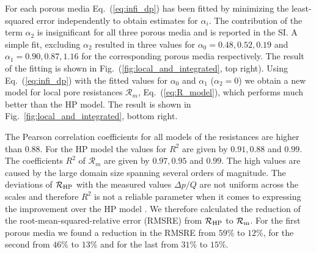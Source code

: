 \documentclass[draft]{agujournal2019}
\begin{document}
For each porous media Eq.~(\ref{eq:infi_dp}) has been fitted by minimizing the least-squared error independently to obtain estimates for $\alpha_i$. The contribution of the term $\alpha_2$ is insignificant for all three porous media and is reported in the SI. A simple fit, excluding $\alpha_2$ resulted in three values for $\alpha_0 = 0.48, 0.52, 0.19$ and $\alpha_1 = 0.90, 0.87, 1.16$ for the corresponding porous media respectively. The result of the fitting is shown in Fig.~(\ref{fig:local_and_integrated}, top right). Using Eq.~(\ref{eq:infi_dp}) with the fitted values for $\alpha_0$ and $\alpha_1$ ($\alpha_2 = 0$) we obtain a new model for local pore resistances $\mathcal{R}_m$, Eq.~(\ref{eq:R_model}), which performs much better than the HP model. The result is shown in Fig.~\ref{fig:local_and_integrated}, bottom right. 

The Pearson correlation coefficients for all models of the resistances are higher than $0.88$. For the HP model the values for $R^2$ are given by $0.91, 0.88$ and $0.99$. The coefficients $R^2$ of $\mathcal{R}_m$ are given by $0.97, 0.95$ and $0.99$. The high values are caused by the large domain size spanning several orders of magnitude. The deviations of $\mathcal{R}_{\rm{HP}}$ with the measured values $\Delta p/Q$ are not uniform across the scales and  therefore $R^2$ is not a reliable parameter when it comes to expressing the improvement over the HP model \cite{wilcox_comparing_2009}. We therefore calculated the reduction of the root-mean-squared-relative error (RMSRE) from $\mathcal{R}_{\rm{HP}}$ to $\mathcal{R}_{\rm{m}}$. For the first porous media we found a reduction in the RMSRE from $59\%$ to $12\%$, for the second from $46\%$ to $13\%$ and for the last from $31\%$ to $15\%$.  
\end{document}
